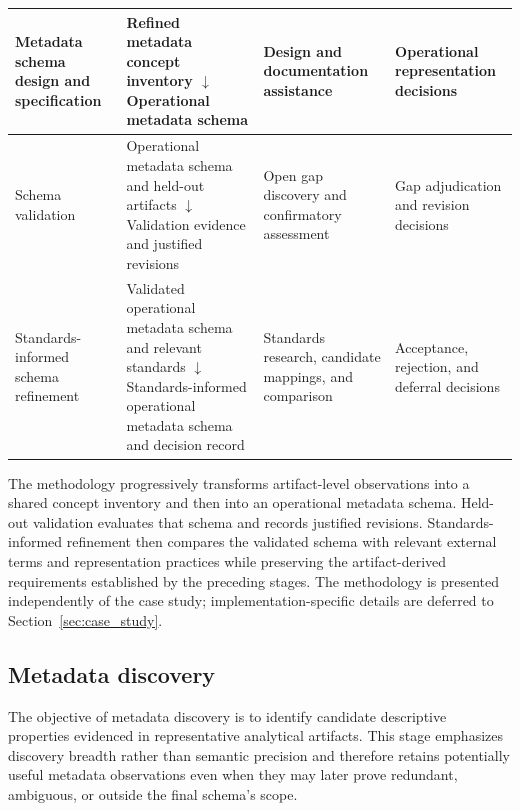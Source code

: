 \documentclass{article}
\begin{document}
\begin{table}[!ht]
\begin{tabularx}{\textwidth}{Y{0.9} Y{1.25} Y{0.9} Y{0.95}}
    \midrule

    Metadata schema design and specification &
    Refined metadata concept inventory \newline $\downarrow$ \newline Operational metadata schema &
    Design and documentation assistance &
    Operational representation decisions \\

    \midrule

    Schema validation &
    Operational metadata schema and held-out artifacts \newline $\downarrow$ \newline Validation evidence and justified revisions &
    Open gap discovery and confirmatory assessment &
    Gap adjudication and revision decisions \\

    \midrule

    Standards-informed schema refinement &
    Validated operational metadata schema and relevant standards \newline $\downarrow$ \newline Standards-informed operational metadata schema and decision record &
    Standards research, candidate mappings, and comparison &
    Acceptance, rejection, and deferral decisions \\

    \bottomrule
    \end{tabularx}
\end{table}

The methodology progressively transforms artifact-level observations into a shared concept inventory and then into an operational metadata schema. Held-out validation evaluates that schema and records justified revisions. Standards-informed refinement then compares the validated schema with relevant external terms and representation practices while preserving the artifact-derived requirements established by the preceding stages. The methodology is presented independently of the case study; implementation-specific details are deferred to Section~\ref{sec:case_study}.

\subsection{Metadata discovery}

The objective of metadata discovery is to identify candidate descriptive properties evidenced in representative analytical artifacts. This stage emphasizes discovery breadth rather than semantic precision and therefore retains potentially useful metadata observations even when they may later prove redundant, ambiguous, or outside the final schema's scope.
\end{document}
